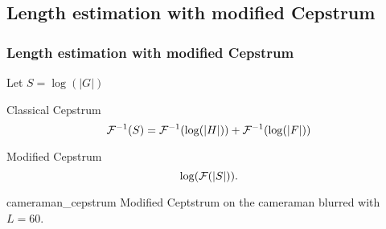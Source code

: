 \subsection{Length estimation with modified Cepstrum}
\begin{frame}[allowframebreaks]
  \frametitle{Length estimation with modified Cepstrum}
  Let $S = \log(|G|)$
  \begin{block}{Classical Cepstrum}
    \[ \mathcal{F}^{-1}(S) = 
    \mathcal{F}^{-1}(\log(|H|)) + \mathcal{F}^{-1}(\log(|F|)) \]
  \end{block}
  \begin{block}{Modified Cepstrum}
    \[ \log(\mathcal{F}(|S|)). \]
  \end{block}
  \begin{myfig}{cameraman_cepstrum}
    {Modified Ceptstrum on the cameraman blurred with $L = 60$.}
  \end{myfig}
\end{frame}

